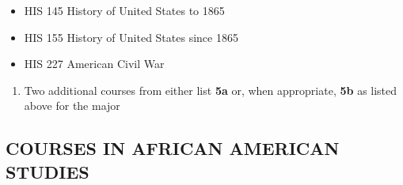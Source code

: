 \documentclass[
  letterpaper,
]{scrbook}
\providecommand{\tightlist}{%
  \setlength{\itemsep}{0pt}\setlength{\parskip}{0pt}}
\begin{document}
\begin{itemize}
\tightlist
\item
  HIS 145 History of United States to 1865
\item
  HIS 155 History of United States since 1865
\item
  HIS 227 American Civil War
\end{itemize}

\begin{enumerate}
\def\labelenumi{\arabic{enumi}.}
\setcounter{enumi}{4}
\tightlist
\item
  Two additional courses from either list \textbf{5a} or, when
  appropriate, \textbf{5b} as listed above for the major
\end{enumerate}

\subsection{COURSES IN AFRICAN AMERICAN
STUDIES}\label{sec-courses-in-african-american-studies}
\end{document}
